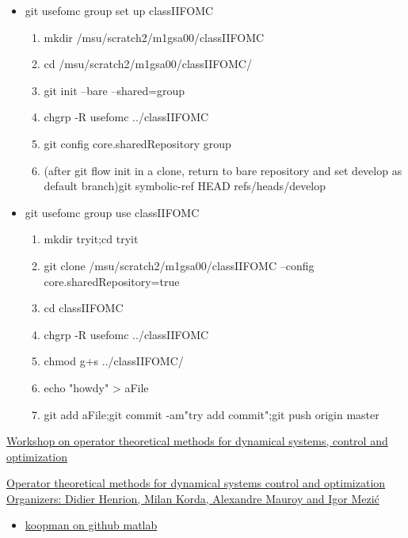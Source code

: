 \documentclass[hyperref]{labbook}
\begin{document}
\begin{itemize}
\item git usefomc group set up classIIFOMC
  \begin{enumerate}
  \item mkdir /msu/scratch2/m1gsa00/classIIFOMC
  \item cd /msu/scratch2/m1gsa00/classIIFOMC/
  \item git init --bare --shared=group
  \item chgrp -R usefomc ../classIIFOMC
  \item git config core.sharedRepository group
\item (after git flow init in a clone, return to bare repository and  set develop as default branch)git symbolic-ref HEAD refs/heads/develop
  \end{enumerate}
\item git usefomc group use classIIFOMC
  \begin{enumerate}
  \item mkdir tryit;cd tryit
  \item git clone /msu/scratch2/m1gsa00/classIIFOMC --config core.sharedRepository=true 
  \item cd classIIFOMC
  \item chgrp -R usefomc ../classIIFOMC
  \item chmod g+s ../classIIFOMC/
  \item echo "howdy" > aFile
  \item git add aFile;git commit -am"try add commit";git push origin master
  \end{enumerate}
\end{itemize}




\href{http://homepages.laas.fr/henrion/ecc15/}{Workshop on operator theoretical methods for dynamical systems, control and optimization }

\href{https://desreg.jku.at/ecc15/workshop_5.html}{Operator theoretical methods for dynamical systems control and optimization
Organizers: Didier Henrion, Milan Korda, Alexandre Mauroy and Igor Mezić
}

\begin{itemize}
\item \href{https://github.com/mbudisic/koopman}{koopman on github matlab}
\end{itemize}


\end{document}
